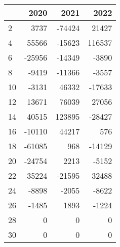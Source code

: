 \begin{tabular}{lrrr}
\toprule
{} &   2020 &    2021 &    2022 \\
\midrule
2  &   3737 &  -74424 &   21427 \\
4  &  55566 &  -15623 &  116537 \\
6  & -25956 &  -14349 &   -3890 \\
8  &  -9419 &  -11366 &   -3557 \\
10 &  -3131 &   46332 &  -17633 \\
12 &  13671 &   76039 &   27056 \\
14 &  40515 &  123895 &  -28427 \\
16 & -10110 &   44217 &     576 \\
18 & -61085 &     968 &  -14129 \\
20 & -24754 &    2213 &   -5152 \\
22 &  35224 &  -21595 &   32488 \\
24 &  -8898 &   -2055 &   -8622 \\
26 &  -1485 &    1893 &   -1224 \\
28 &      0 &       0 &       0 \\
30 &      0 &       0 &       0 \\
\bottomrule
\end{tabular}
